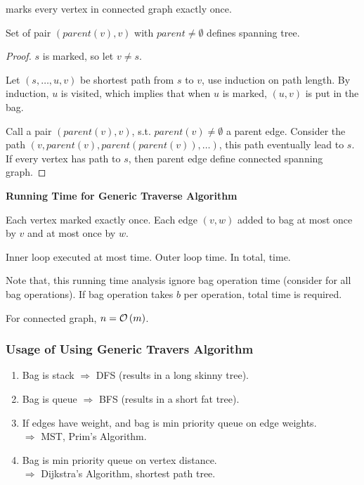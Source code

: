\begin{lemma}
     marks every vertex in connected graph exactly once.

    Set of pair $(parent(v),v)$ with $parent \neq \emptyset$ defines spanning tree.
\end{lemma}

\begin{proof}
    $s$ is marked, so let $v \neq s$.

    Let $(s,\ldots,u,v)$ be shortest path from $s$ to $v$, use induction on path length.
    By induction, $u$ is visited, which implies that when $u$ is marked,
    $(u,v)$ is put in the bag.

    Call a pair $(parent(v),v)$, s.t. $parent(v) \neq \emptyset$ a parent edge.
    Consider the path $(v,parent(v),parent(parent(v)),\ldots)$, this path eventually lead to $s$.
    If every vertex has path to $s$, then parent edge define connected spanning graph.
\end{proof}

\vspace{0.1in}\noindent\textbf{Running Time for Generic Traverse Algorithm}

Each vertex marked exactly once. Each edge $(v,w)$ added to bag at most once
by $v$ and at most once by $w$.

Inner loop executed at most  time.
Outer loop  time. In total,  time.

Note that, this running time analysis ignore bag operation
time (consider  for all bag operations). If bag operation
takes $b$ per operation,  total time is required.

For connected graph, $n = \mathcal{O}\left(m\right)$.

\subsubsection{Usage of Using Generic Travers Algorithm}
\begin{enumerate}
    \item Bag is stack $\Longrightarrow$ DFS (results in a long skinny tree).
    \item Bag is queue $\Longrightarrow$ BFS (results in a short fat tree).
    \item If edges have weight, and bag is min priority queue on edge weights.\\
        $\Longrightarrow$ MST, Prim's Algorithm.
    \item Bag is min priority queue on vertex distance.\\
        $\Longrightarrow$ Dijkstra's Algorithm, shortest path tree.
\end{enumerate}

